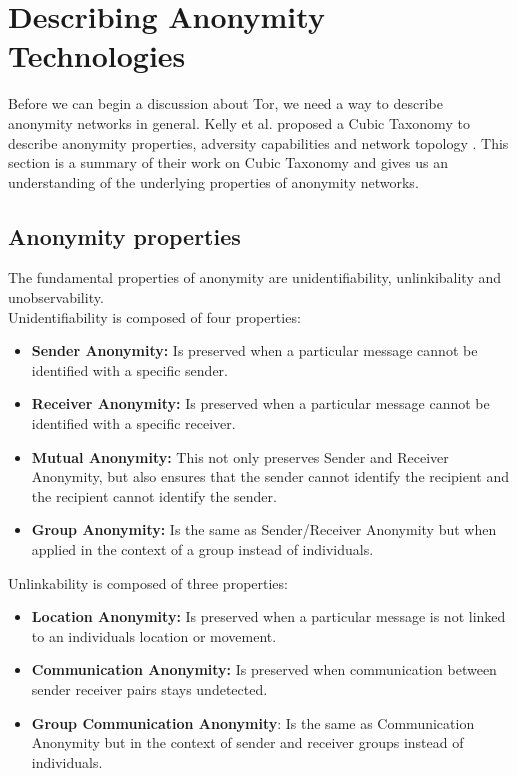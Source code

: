 \documentclass{llncs}
\begin{document}
\section{Describing Anonymity Technologies} \label{taxonomy}
Before we can begin a discussion about Tor,  we need a way to describe anonymity networks in general. Kelly et al. proposed a Cubic Taxonomy to describe anonymity properties, adversity capabilities and network topology \cite{kelly2012exploring}. This section is a summary of their work on Cubic Taxonomy and gives us an understanding of the underlying properties of anonymity networks.

\subsection{Anonymity properties}
The fundamental properties of anonymity are unidentifiability, unlinkibality and unobservability.\\

Unidentifiability is composed of four properties: 
\begin{itemize}
\item[]{\textbf{Sender Anonymity:} Is preserved when a particular message cannot be identified with a specific sender.}
\item[]{\textbf{Receiver Anonymity:} Is preserved when a particular message cannot be identified with a specific receiver.}
\item[]{\textbf{Mutual Anonymity:} This not only preserves Sender and Receiver Anonymity, but also ensures that the sender cannot identify the recipient and the recipient cannot identify the sender.}
\item[]{\textbf{Group Anonymity:} Is the same as Sender/Receiver Anonymity but when applied in the context of a group instead of individuals.}
\end{itemize}

Unlinkability is composed of three properties:
\begin{itemize}
	\item[]{\textbf{Location Anonymity:} Is preserved when a particular message is not linked to an individuals location or movement.}
	\item[]{\textbf{Communication Anonymity:} Is preserved when communication between sender receiver pairs stays undetected.}
	\item[]{\textbf{Group Communication Anonymity}: Is the same as Communication Anonymity but in the context of sender and receiver groups instead of individuals.}
\end{itemize}
\end{document}
